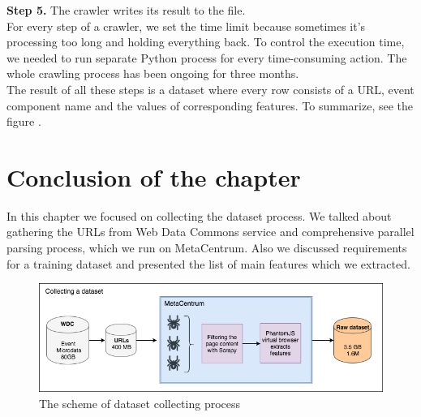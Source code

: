 \noindent\textbf{Step 5.} The crawler writes its result to the file. \\

For every step of a crawler, we set the time limit because sometimes it's processing too long and holding everything back. To control the execution time, we needed to run separate Python process for every time-consuming action. The whole crawling process has been ongoing for three months.\\

The result of all these steps is a dataset where every row consists of a URL, event component name and the values of corresponding features. To summarize, see the figure . 

\section*{Conclusion of the chapter}

In this chapter we focused on collecting the dataset process. We talked about gathering the URLs from Web Data Commons service and comprehensive parallel parsing process, which we run on MetaCentrum. Also we discussed requirements for a training dataset and presented the list of main features which we extracted. 


\begin{figure}[h]
\begin{center}
\includegraphics[width=1.0\textwidth]{dataset_collect}
\caption{The scheme of dataset collecting process}
\label{fig:collect}
\end{center}
\end{figure}

